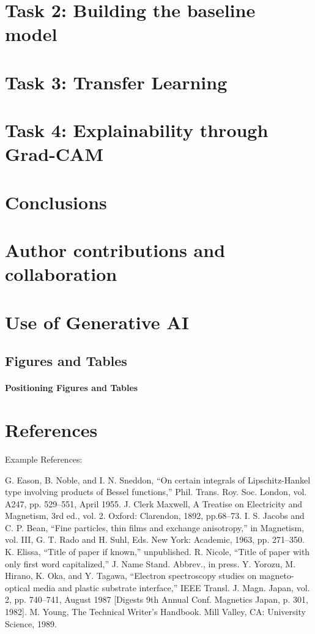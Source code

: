 \documentclass[conference]{IEEEtran}
\begin{document}
\section{Task 2: Building the baseline model}
\section{Task 3: Transfer Learning}
\section{Task 4: Explainability through Grad-CAM}
\section{Conclusions}
\section{Author contributions and collaboration}
\section{Use of Generative AI}


\subsection{Figures and Tables}
\paragraph{Positioning Figures and Tables}




\section*{References}
Example References:
\begin{thebibliography}{00}
 G. Eason, B. Noble, and I. N. Sneddon, ``On certain integrals of Lipschitz-Hankel type involving products of Bessel functions,'' Phil. Trans. Roy. Soc. London, vol. A247, pp. 529--551, April 1955.
 J. Clerk Maxwell, A Treatise on Electricity and Magnetism, 3rd ed., vol. 2. Oxford: Clarendon, 1892, pp.68--73.
 I. S. Jacobs and C. P. Bean, ``Fine particles, thin films and exchange anisotropy,'' in Magnetism, vol. III, G. T. Rado and H. Suhl, Eds. New York: Academic, 1963, pp. 271--350.
 K. Elissa, ``Title of paper if known,'' unpublished.
 R. Nicole, ``Title of paper with only first word capitalized,'' J. Name Stand. Abbrev., in press.
 Y. Yorozu, M. Hirano, K. Oka, and Y. Tagawa, ``Electron spectroscopy studies on magneto-optical media and plastic substrate interface,'' IEEE Transl. J. Magn. Japan, vol. 2, pp. 740--741, August 1987 [Digests 9th Annual Conf. Magnetics Japan, p. 301, 1982].
 M. Young, The Technical Writer's Handbook. Mill Valley, CA: University Science, 1989.
\end{thebibliography}
\end{document}

